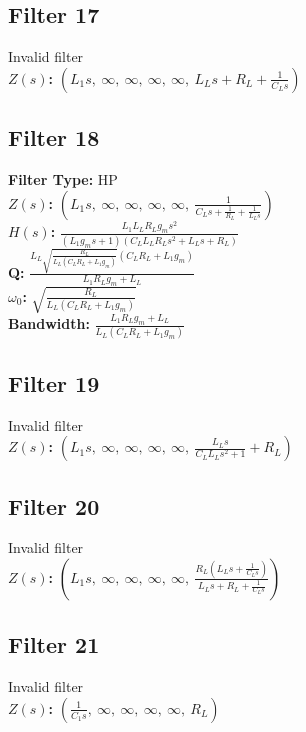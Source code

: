 \documentclass{article}
\begin{document}
\subsection*{Filter 17}
Invalid filter \\ 
\textbf{$Z(s)$:} $\left( L_{1} s, \  \infty, \  \infty, \  \infty, \  \infty, \  L_{L} s + R_{L} + \frac{1}{C_{L} s}\right)$ \\ 
\subsection*{Filter 18}
\textbf{Filter Type:} HP \\ 
\textbf{$Z(s)$:} $\left( L_{1} s, \  \infty, \  \infty, \  \infty, \  \infty, \  \frac{1}{C_{L} s + \frac{1}{R_{L}} + \frac{1}{L_{L} s}}\right)$ \\ 
\textbf{$H(s)$:} $\frac{L_{1} L_{L} R_{L} g_{m} s^{2}}{\left(L_{1} g_{m} s + 1\right) \left(C_{L} L_{L} R_{L} s^{2} + L_{L} s + R_{L}\right)}$ \\ 
\textbf{Q:} $\frac{L_{L} \sqrt{\frac{R_{L}}{L_{L} \left(C_{L} R_{L} + L_{1} g_{m}\right)}} \left(C_{L} R_{L} + L_{1} g_{m}\right)}{L_{1} R_{L} g_{m} + L_{L}}$ \\ 
\textbf{$\omega_0$:} $\sqrt{\frac{R_{L}}{L_{L} \left(C_{L} R_{L} + L_{1} g_{m}\right)}}$ \\ 
\textbf{Bandwidth:} $\frac{L_{1} R_{L} g_{m} + L_{L}}{L_{L} \left(C_{L} R_{L} + L_{1} g_{m}\right)}$ \\ 
\subsection*{Filter 19}
Invalid filter \\ 
\textbf{$Z(s)$:} $\left( L_{1} s, \  \infty, \  \infty, \  \infty, \  \infty, \  \frac{L_{L} s}{C_{L} L_{L} s^{2} + 1} + R_{L}\right)$ \\ 
\subsection*{Filter 20}
Invalid filter \\ 
\textbf{$Z(s)$:} $\left( L_{1} s, \  \infty, \  \infty, \  \infty, \  \infty, \  \frac{R_{L} \left(L_{L} s + \frac{1}{C_{L} s}\right)}{L_{L} s + R_{L} + \frac{1}{C_{L} s}}\right)$ \\ 
\subsection*{Filter 21}
Invalid filter \\ 
\textbf{$Z(s)$:} $\left( \frac{1}{C_{1} s}, \  \infty, \  \infty, \  \infty, \  \infty, \  R_{L}\right)$ \\ 
\end{document}
